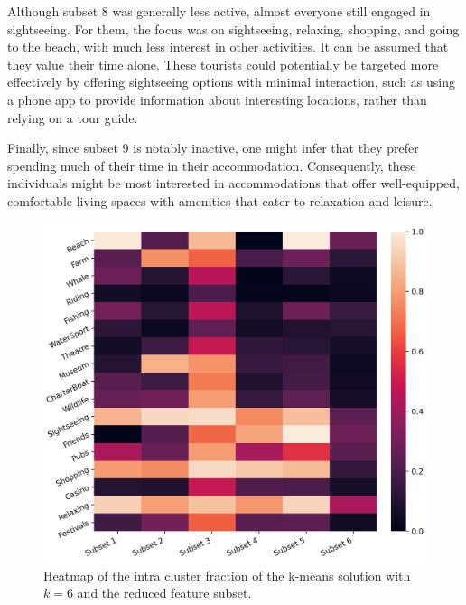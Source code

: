 \documentclass[article]{ajs}
\begin{document}
Although subset 8 was generally less active, almost everyone still engaged in sightseeing. For them, the focus was on sightseeing, relaxing, shopping, and going to the beach, with much less interest in other activities. It can be assumed that they value their time alone. These tourists could potentially be targeted more effectively by offering sightseeing options with minimal interaction, such as using a phone app to provide information about interesting locations, rather than relying on a tour guide.

Finally, since subset 9 is notably inactive, one might infer that they prefer spending much of their time in their accommodation. Consequently, these individuals might be most interested in accommodations that offer well-equipped, comfortable living spaces with amenities that cater to relaxation and leisure.


\begin{figure}[h!]
    \centering
    \includegraphics[width=1\textwidth]{aus_heatmap.png}
    \caption{Heatmap of the intra cluster fraction of the k-means solution with \( k = 6 \) and the reduced feature subset.}
    \label{fig:aus_heatmapg}
\end{figure}
\end{document}
